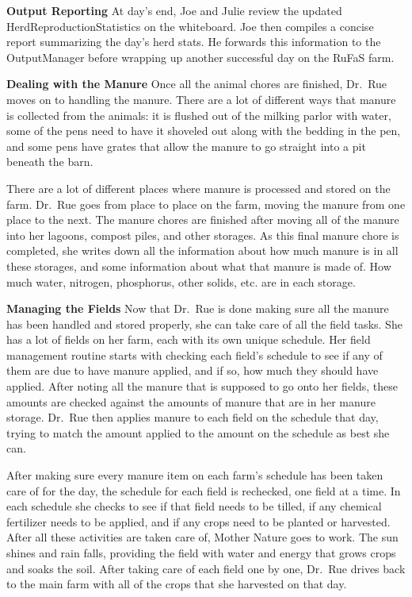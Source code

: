 \documentclass[
  letterpaper,
  DIV=11,
  numbers=noendperiod]{scrreprt}
\begin{document}
\textbf{Output Reporting} At day's end, Joe and Julie review the updated
HerdReproductionStatistics on the whiteboard. Joe then compiles a
concise report summarizing the day's herd stats. He forwards this
information to the OutputManager before wrapping up another successful
day on the RuFaS farm.

\textbf{Dealing with the Manure} Once all the animal chores are
finished, Dr.~Rue moves on to handling the manure. There are a lot of
different ways that manure is collected from the animals: it is flushed
out of the milking parlor with water, some of the pens need to have it
shoveled out along with the bedding in the pen, and some pens have
grates that allow the manure to go straight into a pit beneath the barn.

There are a lot of different places where manure is processed and stored
on the farm. Dr.~Rue goes from place to place on the farm, moving the
manure from one place to the next. The manure chores are finished after
moving all of the manure into her lagoons, compost piles, and other
storages. As this final manure chore is completed, she writes down all
the information about how much manure is in all these storages, and some
information about what that manure is made of. How much water, nitrogen,
phosphorus, other solids, etc. are in each storage.

\textbf{Managing the Fields} Now that Dr.~Rue is done making sure all
the manure has been handled and stored properly, she can take care of
all the field tasks. She has a lot of fields on her farm, each with its
own unique schedule. Her field management routine starts with checking
each field's schedule to see if any of them are due to have manure
applied, and if so, how much they should have applied. After noting all
the manure that is supposed to go onto her fields, these amounts are
checked against the amounts of manure that are in her manure storage.
Dr.~Rue then applies manure to each field on the schedule that day,
trying to match the amount applied to the amount on the schedule as best
she can.

After making sure every manure item on each farm's schedule has been
taken care of for the day, the schedule for each field is rechecked, one
field at a time. In each schedule she checks to see if that field needs
to be tilled, if any chemical fertilizer needs to be applied, and if any
crops need to be planted or harvested. After all these activities are
taken care of, Mother Nature goes to work. The sun shines and rain
falls, providing the field with water and energy that grows crops and
soaks the soil. After taking care of each field one by one, Dr.~Rue
drives back to the main farm with all of the crops that she harvested on
that day.
\end{document}
